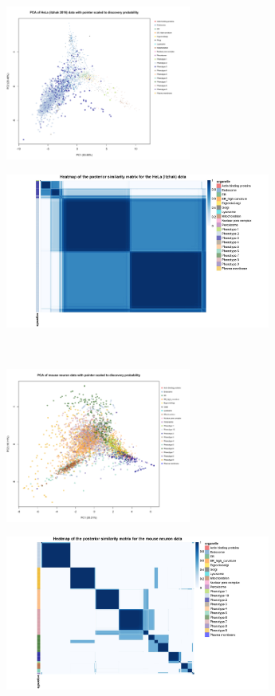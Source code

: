 \documentclass[12pt,english]{article}
\begin{document}
\begin{figure}
	\begin{subfigure}[t]{0.5\textwidth}
		\centering
		\includegraphics[height=2in]{pcaItzhak2016.pdf}
		\caption{}
	\end{subfigure}
	\begin{subfigure}[t]{0.5\textwidth}
		\centering
		\includegraphics[height=2in]{itzhak2016heatmap.jpg}
		\caption{}
	\end{subfigure}
	~
	\begin{subfigure}[t]{0.5\textwidth}
		\centering
		\includegraphics[height=2in]{pcaItzhak2017.pdf}
		\caption{}
	\end{subfigure}
	\begin{subfigure}[t]{0.5\textwidth}
		\centering
		\includegraphics[height=2in]{heatmapItzhak2017.jpg}

\end{subfigure}
\end{figure}
\end{document}

